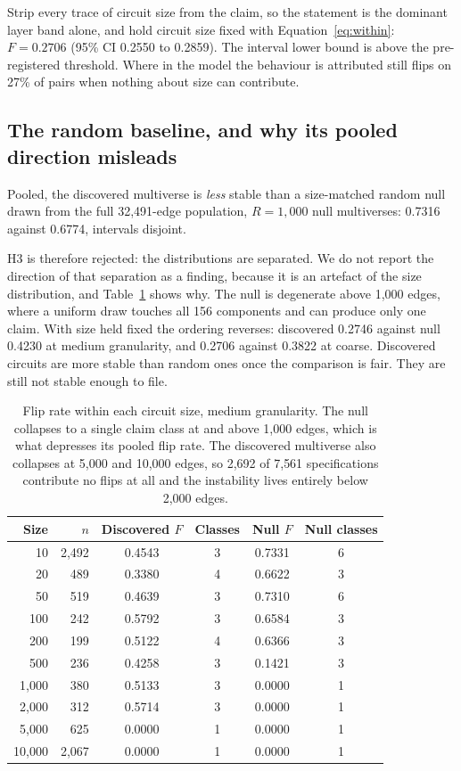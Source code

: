 \documentclass[11pt]{article}
\begin{document}
Strip every trace of circuit size from the claim, so the statement is the dominant
layer band alone, and hold circuit size fixed with Equation~\ref{eq:within}:
$F = 0.2706$ (95\% CI 0.2550 to 0.2859). The interval lower bound is above the
pre-registered threshold. Where in the model the behaviour is attributed still
flips on 27\% of pairs when nothing about size can contribute.

\subsection{The random baseline, and why its pooled direction misleads}
\label{sec:null}

Pooled, the discovered multiverse is \emph{less} stable than a size-matched random
null drawn from the full 32{,}491-edge population, $R = 1{,}000$ null multiverses:
0.7316 against 0.6774, intervals disjoint.

H3 is therefore rejected: the distributions are separated. We do not report the
direction of that separation as a finding, because it is an artefact of the size
distribution, and Table~\ref{tab:bysize} shows why. The null is degenerate above 1{,}000 edges,
where a uniform draw touches all 156 components and can produce only one claim.
With size held fixed the ordering reverses: discovered 0.2746 against null 0.4230
at medium granularity, and 0.2706 against 0.3822 at coarse. Discovered circuits
are more stable than random ones once the comparison is fair. They are still not
stable enough to file.

\begin{table}[htbp]
\centering
\caption{Flip rate within each circuit size, medium granularity. The null
collapses to a single claim class at and above 1{,}000 edges, which is what
depresses its pooled flip rate. The discovered multiverse also collapses at
5{,}000 and 10{,}000 edges, so 2{,}692 of 7{,}561 specifications contribute no
flips at all and the instability lives entirely below 2{,}000 edges.}
\label{tab:bysize}
\begin{tabular}{rrcccc}
\toprule
Size & $n$ & Discovered $F$ & Classes & Null $F$ & Null classes \\
\midrule
10 & 2,492 & 0.4543 & 3 & 0.7331 & 6 \\
20 & 489 & 0.3380 & 4 & 0.6622 & 3 \\
50 & 519 & 0.4639 & 3 & 0.7310 & 6 \\
100 & 242 & 0.5792 & 3 & 0.6584 & 3 \\
200 & 199 & 0.5122 & 4 & 0.6366 & 3 \\
500 & 236 & 0.4258 & 3 & 0.1421 & 3 \\
1,000 & 380 & 0.5133 & 3 & 0.0000 & 1 \\
2,000 & 312 & 0.5714 & 3 & 0.0000 & 1 \\
5,000 & 625 & 0.0000 & 1 & 0.0000 & 1 \\
10,000 & 2,067 & 0.0000 & 1 & 0.0000 & 1 \\
\bottomrule
\end{tabular}
\end{table}
\end{document}
